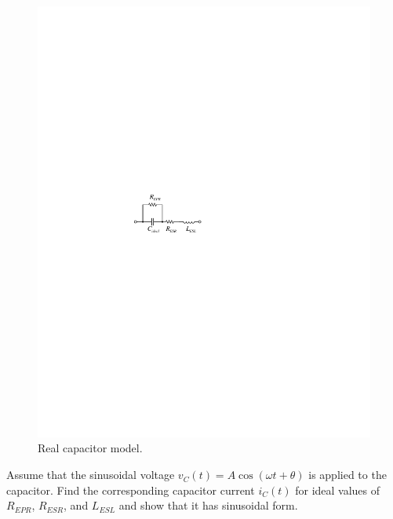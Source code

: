 \documentclass[11pt]{article}
\begin{document}

\begin{question}


    \begin{figure}[H]
        \centering
        \includegraphics[scale=1.5,angle=0]{Fig/cir4.pdf}
        \caption{Real capacitor model.} \label{fig:cir4}
    \end{figure}

    \begin{subquestion}{Assume that the sinusoidal voltage $v_C(t)=A\cos(\omega t+\theta)$ is applied to the capacitor. Find the corresponding capacitor current $i_C(t)$ for ideal values of $R_{EPR}$, $R_{ESR}$, and $L_{ESL}$ and show that it has sinusoidal form.}
\end{subquestion}
\end{question}
\end{document}
